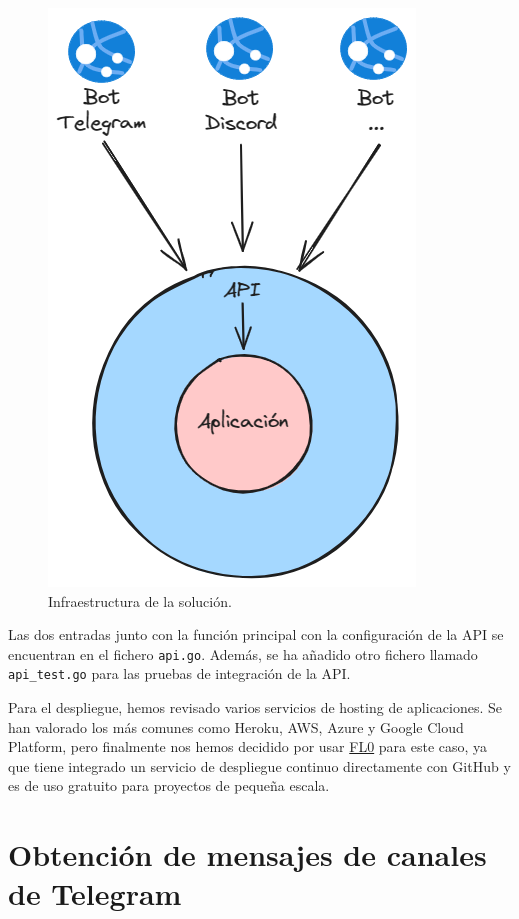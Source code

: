 \begin{figure}[h]
    \centering
    \includegraphics[scale=0.5]{figuras/infraestructura-solucion.png}
    \caption{Infraestructura de la solución.}
    \label{fig:infraestructura}
\end{figure}

Las dos entradas junto con la función principal con la configuración de la API se 
encuentran en el fichero \verb|api.go|. Además, se ha añadido otro fichero llamado 
\verb|api_test.go| para las pruebas de integración de la API.

Para el despliegue, hemos revisado varios servicios de hosting de aplicaciones. Se 
han valorado los más comunes como Heroku, AWS, Azure y Google Cloud Platform, pero 
finalmente nos hemos decidido por usar \href{https://www.fl0.com}{FL0} para 
este caso, ya que tiene integrado un servicio de despliegue continuo directamente 
con GitHub y es de uso gratuito para proyectos de pequeña escala.

\section{Obtención de mensajes de canales de Telegram}

